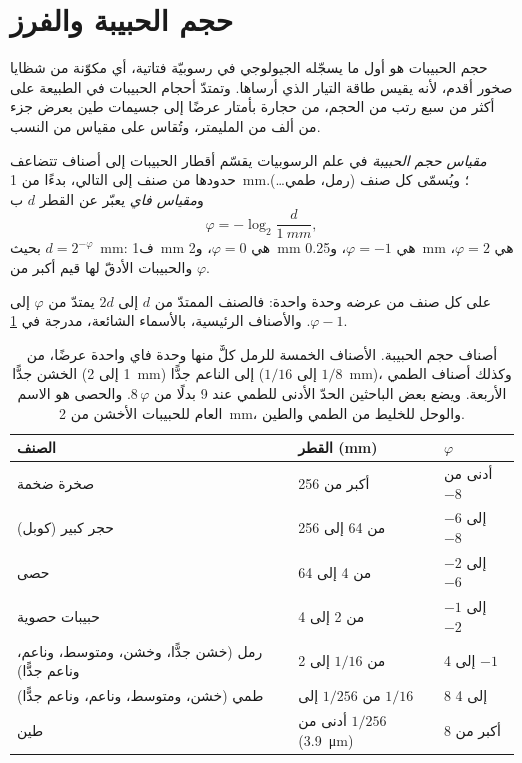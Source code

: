 \section{حجم الحبيبة والفرز}\label{sec:b1:clastic-sediments:grain-size}

حجم الحبيبات هو أول ما يسجّله الجيولوجي في رسوبيّة فتاتية، أي مكوّنة من شظايا صخور أقدم، لأنه يقيس طاقة التيار الذي أرساها. وتمتدّ أحجام الحبيبات في الطبيعة على أكثر من سبع رتب من الحجم، من حجارة بأمتار عرضًا إلى جسيمات طين بعرض جزء من ألف من المليمتر، وتُقاس على مقياس من النسب.

\begin{definition}\label{def:b1:clastic-sediments:grain-size}
\emph{مقياس حجم الحبيبة} في علم الرسوبيات يقسّم أقطار الحبيبات إلى أصناف تتضاعف حدودها من صنف إلى التالي، بدءًا من \qty{1}{mm}؛ ويُسمّى كل صنف (رمل، طمي\ldots). و\emph{مقياس فاي} يعبّر عن القطر $d$ ب
\[
  \varphi = -\log_2 \frac{d}{\qty{1}{mm}},
\]
بحيث $d = 2^{-\varphi}$~mm: ف\qty{1}{mm} هي $\varphi = 0$، و\qty{2}{mm} هي
$\varphi = -1$، و\qty{0.25}{mm} هي $\varphi = 2$، والحبيبات الأدقّ لها قيم أكبر من $\varphi$.
\end{definition}

على  كل صنف من  عرضه وحدة واحدة: فالصنف الممتدّ من $d$ إلى $2d$ يمتدّ من $\varphi$ إلى $\varphi - 1$. والأصناف الرئيسية، بالأسماء الشائعة، مدرجة في \cref{tab:b1:clastic-sediments:classes}.

\begin{table}[htbp]
\centering\small
\begin{tabular}{@{}lll@{}}
\hline
الصنف & القطر (\si{mm}) & $\varphi$ \\
\hline
صخرة ضخمة & أكبر من 256 & أدنى من $-8$ \\
حجر كبير (كوبل) & من 64 إلى 256 & $-6$ إلى $-8$ \\
حصى & من 4 إلى 64 & $-2$ إلى $-6$ \\
حبيبات حصوية & من 2 إلى 4 & $-1$ إلى $-2$ \\
رمل (خشن جدًّا، وخشن، ومتوسط، وناعم، وناعم جدًّا) & من $1/16$ إلى 2 & 4 إلى $-1$ \\
طمي (خشن، ومتوسط، وناعم، وناعم جدًّا) & من $1/256$ إلى $1/16$ & 8 إلى 4 \\
طين & أدنى من $1/256$ (\qty{3.9}{\micro m}) & أكبر من 8 \\
\hline
\end{tabular}
\caption{أصناف حجم الحبيبة. الأصناف الخمسة للرمل كلٌّ منها وحدة فاي واحدة عرضًا، من الخشن جدًّا (1 إلى \qty{2}{mm}) إلى الناعم جدًّا ($1/16$ إلى $1/8$~mm)، وكذلك أصناف الطمي الأربعة. ويضع بعض الباحثين الحدّ الأدنى للطمي عند 9 بدلًا من $8\,\varphi$. والحصى هو الاسم العام للحبيبات الأخشن من \qty{2}{mm}، والوحل للخليط من الطمي والطين.}
\label{tab:b1:clastic-sediments:classes}
\end{table}

